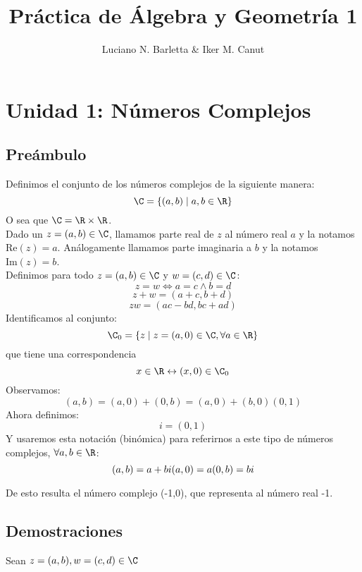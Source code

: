\documentclass[10pt]{article}
\author{Luciano N. Barletta \& Iker M. Canut}
\begin{document}
\title{Práctica de Álgebra y Geometría 1}
\maketitle
\date
\newpage

\tableofcontents
\newpage

\section{Unidad 1: Números Complejos}

\subsection{Preámbulo}

Definimos el conjunto de los números complejos de la siguiente manera:
$$\C = \{(a,b) \mid a,b \in \R \}$$
O sea que $\C = \R \times \R$.\\
Dado un $z = (a,b) \in \C$, llamamos parte real de $z$ al número real $a$ y la notamos $\text{Re}(z) = a$. Análogamente llamamos parte imaginaria a $b$ y la notamos $\text{Im}(z) = b$.\\
Definimos para todo $z=(a,b) \in \C$ y $w=(c,d) \in \C$:
$$z=w \Leftrightarrow a=c \land b=d$$
$$z+w = (a+c,b+d)$$
$$zw = (ac-bd,bc+ad)$$
Identificamos al conjunto:
$$\C_0 = \{ z \mid z = (a,0) \in \C, \forall a \in \R \}$$
que tiene una correspondencia
$$x \in \R \leftrightarrow (x,0) \in \C_0$$
Observamos:
$$(a,b) = (a,0)+(0,b) = (a,0)+(b,0)(0,1)$$
Ahora definimos:
$$i = (0,1)$$
Y usaremos esta notación (binómica) para referirnos a este tipo de números complejos, $\forall a,b \in \R$:
$$
(a,b) = a+bi\\
(a,0) = a\\
(0,b) = bi\\
$$
\begin{prf}[$i^2 = -1$]{}
	De esto resulta el número complejo (-1,0), que representa al número real -1.
\end{prf}

\subsection{Demostraciones}

\begin{prf}{}
	Sean $z = (a,b), w = (c,d) \in \C$\\

\end{prf}
\end{document}
